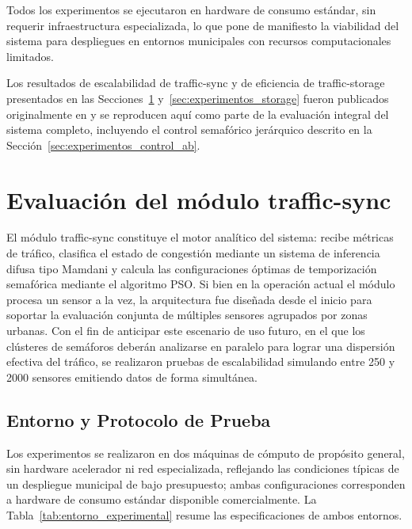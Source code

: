Todos los experimentos se ejecutaron en hardware de consumo estándar, sin requerir
infraestructura especializada, lo que pone de manifiesto la viabilidad del sistema para
despliegues en entornos municipales con recursos computacionales limitados.

Los resultados de escalabilidad de traffic-sync y de eficiencia de traffic-storage
presentados en las Secciones~\ref{sec:experimentos_sync} y~\ref{sec:experimentos_storage}
fueron publicados originalmente en \cite{chilecon2025} y se reproducen aquí como parte de
la evaluación integral del sistema completo, incluyendo el control semafórico jerárquico
descrito en la Sección~\ref{sec:experimentos_control_ab}.

\section{Evaluación del módulo traffic-sync}
\label{sec:experimentos_sync}

El módulo traffic-sync constituye el motor analítico del sistema: recibe métricas
de tráfico, clasifica el estado de congestión mediante un sistema de inferencia difusa tipo
Mamdani y calcula las configuraciones óptimas de temporización semafórica mediante el
algoritmo PSO\@. Si bien en la operación actual el módulo procesa un sensor a la vez, la
arquitectura fue diseñada desde el inicio para soportar la evaluación conjunta de múltiples
sensores agrupados por zonas urbanas. Con el fin de anticipar este escenario de uso futuro, en el que los clústeres de semáforos
deberán analizarse en paralelo para lograr una dispersión efectiva del tráfico, se
realizaron pruebas de escalabilidad simulando entre 250 y 2000 sensores emitiendo datos de
forma simultánea.

\subsection{Entorno y Protocolo de Prueba}
\label{subsec:sync_entorno_protocolo}

Los experimentos se realizaron en dos máquinas de cómputo de propósito general, sin
hardware acelerador ni red especializada, reflejando las condiciones típicas de un
despliegue municipal de bajo presupuesto; ambas configuraciones corresponden a hardware
de consumo estándar disponible comercialmente. La Tabla~\ref{tab:entorno_experimental}
resume las especificaciones de ambos entornos.

